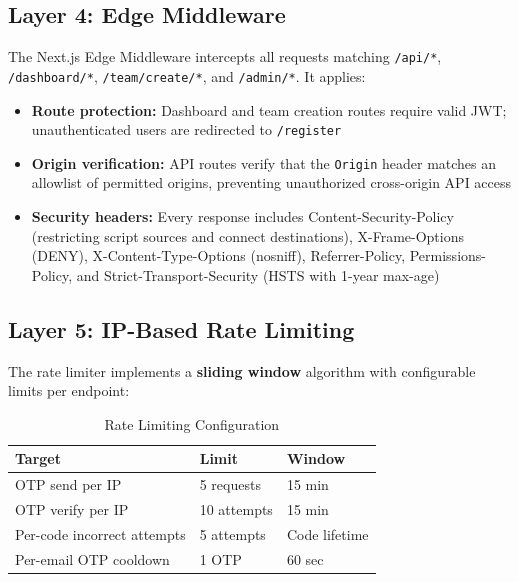 \documentclass[conference]{IEEEtran}
\begin{document}
\subsection{Layer 4: Edge Middleware}

The Next.js Edge Middleware intercepts all requests matching \texttt{/api/*}, \texttt{/dashboard/*}, \texttt{/team/create/*}, and \texttt{/admin/*}. It applies:

\begin{itemize}[noitemsep,topsep=3pt]
    \item \textbf{Route protection:} Dashboard and team creation routes require valid JWT; unauthenticated users are redirected to \texttt{/register}
    \item \textbf{Origin verification:} API routes verify that the \texttt{Origin} header matches an allowlist of permitted origins, preventing unauthorized cross-origin API access
    \item \textbf{Security headers:} Every response includes Content-Security-Policy (restricting script sources and connect destinations), X-Frame-Options (DENY), X-Content-Type-Options (nosniff), Referrer-Policy, Permissions-Policy, and Strict-Transport-Security (HSTS with 1-year max-age)~\cite{owasp2021}
\end{itemize}

\subsection{Layer 5: IP-Based Rate Limiting}

The rate limiter implements a \textbf{sliding window} algorithm with configurable limits per endpoint:

\begin{table}[htbp]
\centering
\caption{Rate Limiting Configuration}
\label{tab:ratelimit}
\footnotesize
\renewcommand{\arraystretch}{1.15}
\begin{tabular}{@{}lll@{}}
\toprule
\textbf{Target} & \textbf{Limit} & \textbf{Window} \\
\midrule
OTP send per IP & 5 requests & 15 min \\
OTP verify per IP & 10 attempts & 15 min \\
Per-code incorrect attempts & 5 attempts & Code lifetime \\
Per-email OTP cooldown & 1 OTP & 60 sec \\
\bottomrule
\end{tabular}
\end{table}
\end{document}
